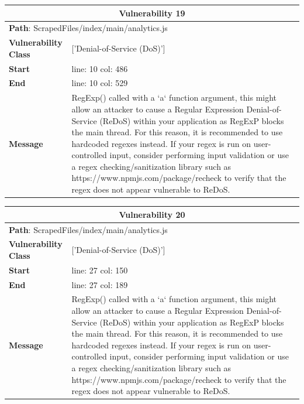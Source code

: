 \documentclass[12pt]{article}
\begin{document}
\vspace{0.7cm}
\FloatBarrier
\begin{table}[!h]
\centering
\renewcommand{\arraystretch}{1.3}
\begin{tabular}{|l|p{10cm}|}
\hline
\multicolumn{2}{|c|}{\textbf{Vulnerability 19}} \\
\hline
\multicolumn{2}{|l|}{\textbf{Path}: ScrapedFiles/index/main/analytics.js} \\
\hline
\textbf{Vulnerability Class} & ['Denial-of-Service (DoS)'] \\
\hline
\textbf{Start} & line: 10 \quad col: 486 \\
\hline
\textbf{End} & line: 10 \quad col: 529 \\
\hline
\textbf{Message} & RegExp() called with a `a` function argument, this might allow an attacker to cause a Regular Expression Denial-of-Service (ReDoS) within your application as RegExP blocks the main thread. For this reason, it is recommended to use hardcoded regexes instead. If your regex is run on user-controlled input, consider performing input validation or use a regex checking/sanitization library such as https://www.npmjs.com/package/recheck to verify that the regex does not appear vulnerable to ReDoS. \\
\hline
\end{tabular}
\end{table}
\vspace{0.7cm}
\FloatBarrier
\begin{table}[!h]
\centering
\renewcommand{\arraystretch}{1.3}
\begin{tabular}{|l|p{10cm}|}
\hline
\multicolumn{2}{|c|}{\textbf{Vulnerability 20}} \\
\hline
\multicolumn{2}{|l|}{\textbf{Path}: ScrapedFiles/index/main/analytics.js} \\
\hline
\textbf{Vulnerability Class} & ['Denial-of-Service (DoS)'] \\
\hline
\textbf{Start} & line: 27 \quad col: 150 \\
\hline
\textbf{End} & line: 27 \quad col: 189 \\
\hline
\textbf{Message} & RegExp() called with a `a` function argument, this might allow an attacker to cause a Regular Expression Denial-of-Service (ReDoS) within your application as RegExP blocks the main thread. For this reason, it is recommended to use hardcoded regexes instead. If your regex is run on user-controlled input, consider performing input validation or use a regex checking/sanitization library such as https://www.npmjs.com/package/recheck to verify that the regex does not appear vulnerable to ReDoS. \\
\hline
\end{tabular}
\end{table}
\end{document}
